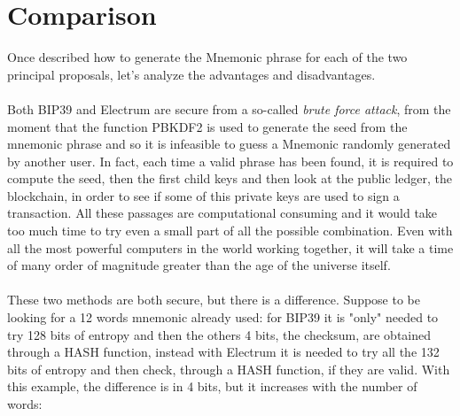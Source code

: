 \section{Comparison}
Once described how to generate the Mnemonic phrase for each of the two principal proposals, let's analyze the advantages and disadvantages.
\\ \\
Both BIP39 and Electrum are secure from a so-called \textit{brute force attack}, from the moment that the function PBKDF2 is used to generate the seed from the mnemonic phrase and so it is infeasible to guess a Mnemonic randomly generated by another user. In fact, each time a valid phrase has been found, it is required to compute the seed, then the first child keys and then look at the public ledger, the blockchain, in order to see if some of this private keys are used to sign a transaction. All these passages are computational consuming and it would take too much time to try even a small part of all the possible combination. Even with all the most powerful computers in the world working together, it will take a time of many order of magnitude greater than the age of the universe itself.
\\ \\
These two methods are both secure, but there is a difference. Suppose to be looking for a 12 words mnemonic already used: for BIP39 it is "only" needed to try 128 bits of entropy and then the others 4 bits, the checksum, are obtained through a HASH function, instead with Electrum it is needed to try all the 132 bits of entropy and then check, through a HASH function, if they are valid. With this example, the difference is in 4 bits, but it increases with the number of words:

